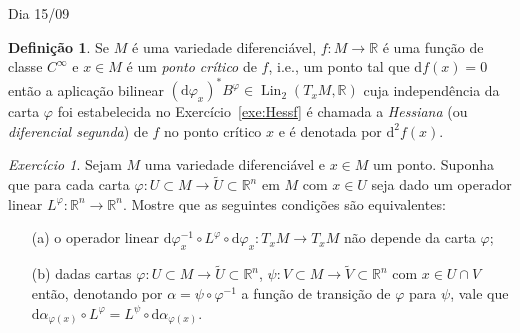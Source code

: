 \documentclass[oneside,11pt]{amsart}
\newcommand{\R}{\mathds R}
\newcommand{\dd}{\mathrm d}
\DeclareMathOperator{\Lin}{Lin}
\theoremstyle{remark}\newtheorem{exercise}{Exercício}[section]
\theoremstyle{plain}\newtheorem{teo}{Teorema}[section]
\theoremstyle{plain}\newtheorem{lem}[teo]{Lema}
\theoremstyle{plain}\newtheorem{prop}[teo]{Proposição}
\theoremstyle{definition}\newtheorem{defin}[teo]{Definição}
\theoremstyle{remark}\newtheorem{rem}[teo]{Observação}
\theoremstyle{definition}\newtheorem{example}[teo]{Exemplo}
\numberwithin{equation}{section}
\begin{document}
\begin{section}{Dia 15/09}
\begin{defin}
Se $M$ é uma variedade diferenciável, $f:M\to\R$ é uma função de classe $C^\infty$ e $x\in M$ é um {\em ponto crítico\/} de $f$, i.e., um ponto
tal que $\dd f(x)=0$ então a aplicação bilinear $(\dd\varphi_x)^*B^\varphi\in\Lin_2(T_xM,\R)$ cuja independência da carta $\varphi$ foi estabelecida
no Exercício~\ref{exe:Hessf} é chamada a {\em Hessiana\/} (ou {\em diferencial segunda}) de $f$ no ponto crítico $x$ e é denotada por $\dd^2f(x)$.
\end{defin}

\begin{exercise}\label{exe:lintang}
Sejam $M$ uma variedade diferenciável e $x\in M$ um ponto. Suponha que para cada carta $\varphi:U\subset M\to\widetilde U\subset\R^n$ em $M$
com $x\in U$ seja dado um operador linear $L^\varphi:\R^n\to\R^n$. Mostre que as seguintes condições são equivalentes:
\begin{itemize}
\item[(a)] o operador linear $\dd\varphi_x^{-1}\circ L^\varphi\circ\dd\varphi_x:T_xM\to T_xM$ não depende da carta $\varphi$;
\item[(b)] dadas cartas $\varphi:U\subset M\to\widetilde U\subset\R^n$, $\psi:V\subset M\to\widetilde V\subset\R^n$ com $x\in U\cap V$ então,
denotando por $\alpha=\psi\circ\varphi^{-1}$ a função de transição de $\varphi$ para $\psi$,
vale que $\dd\alpha_{\varphi(x)}\circ L^\varphi=L^\psi\circ\dd\alpha_{\varphi(x)}$.
\end{itemize}
\end{exercise}


\end{section}
\end{document}
